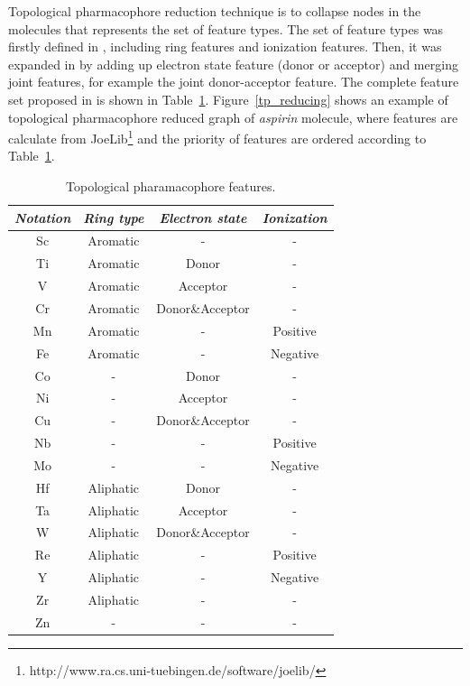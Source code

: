 \documentclass[english]{tktltiki}
\begin{document}
Topological pharmacophore reduction technique is to collapse nodes in the molecules that represents the set of feature types. The set of feature types was firstly defined in \cite{gillet03}, including ring features and ionization features. Then, it was expanded in \cite{harper} by adding up electron state feature (donor or acceptor) and merging joint features, for example the joint donor-acceptor feature. The complete feature set proposed in \cite{harper} is shown in Table~\ref{tp_feature}. Figure~\ref{tp_reducing} shows an example of topological pharmacophore reduced graph of {\em aspirin} molecule, where features are calculate from JoeLib\footnote{http://www.ra.cs.uni-tuebingen.de/software/joelib/} and the priority of features are ordered according to Table~\ref{tp_feature}.

\begin{center}
\begin{table}\small
\centering
\begin{tabular}{|c|c|c|c|}\hline
\textbf{\em Notation}	&\textbf{\em Ring type}	&\textbf{\em Electron state}	&\textbf{\em Ionization}\\ \hline \hline
Sc &Aromatic &- &- \\ \hline
Ti &Aromatic &Donor &- \\ \hline
V &Aromatic &Acceptor &- \\ \hline
Cr &Aromatic &Donor\&Acceptor &- \\ \hline
Mn &Aromatic &- &Positive \\ \hline
Fe &Aromatic &- &Negative \\ \hline
Co &- &Donor &- \\ \hline
Ni &- &Acceptor &- \\ \hline
Cu &- &Donor\&Acceptor &- \\ \hline
Nb &- &- &Positive \\ \hline
Mo &- &- &Negative \\ \hline
Hf &Aliphatic &Donor &- \\ \hline
Ta &Aliphatic &Acceptor &- \\ \hline
W &Aliphatic &Donor\&Acceptor &- \\ \hline
Re &Aliphatic &- &Positive \\ \hline
Y &Aliphatic &- &Negative \\ \hline
Zr &Aliphatic &- &- \\ \hline
Zn &- &- &- \\ \hline
\end{tabular}
\caption[Topological pharmacophore features.]{Topological pharamacophore features.}
\label{tp_feature}
\end{table}
\end{center} 
\end{document}

